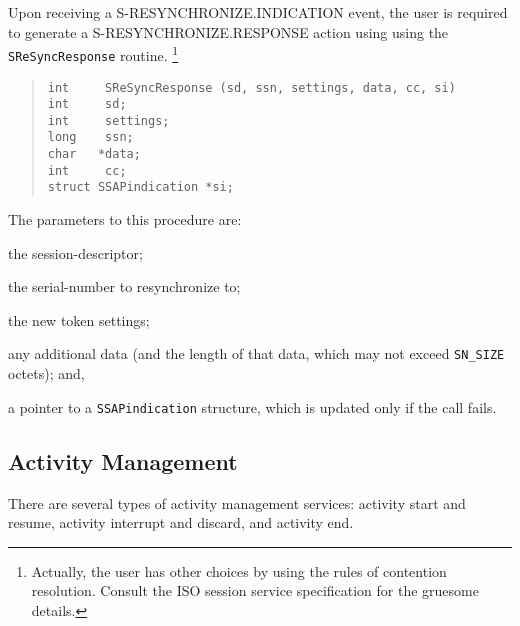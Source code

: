 Upon receiving a {\sf S-RESYNCHRONIZE.INDICATION\/} event,
the user is required to generate a {\sf S-RESYNCHRONIZE.RESPONSE\/} action
using using the \verb"SReSyncResponse" routine.%
\footnote{Actually,
the user has other choices by using the rules of contention resolution.
Consult the ISO session service specification for the gruesome details.}
\begin{quote}\small\begin{verbatim}
int     SReSyncResponse (sd, ssn, settings, data, cc, si)
int     sd;
int     settings;
long    ssn;
char   *data;
int     cc;
struct SSAPindication *si;
\end{verbatim}\end{quote}
The parameters to this procedure are:
\begin{describe}
\item[\verb"sd":] the session-descriptor;

\item[\verb"ssn":] the serial-number to resynchronize to;

\item[\verb"settings":] the new token settings;

\item[\verb"data"/\verb"cc":] any additional data
(and the length of that data, which may not exceed \verb"SN_SIZE" octets);
and,

\item[\verb"si":] a pointer to a \verb"SSAPindication" structure, which is
updated only if the call fails.
\end{describe}

\subsection	{Activity Management}
There are several types of activity management services:
activity start and resume,
activity interrupt and discard,
and activity end.

